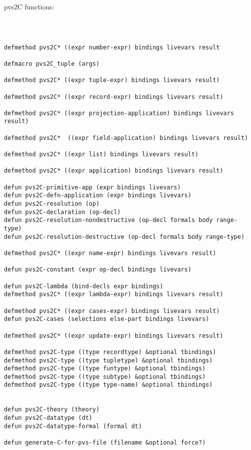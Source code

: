 \documentclass[12pt,a4paper,titlepage]{article}
\begin{document}
pvs2C functions:
\begin{lstlisting}



defmethod pvs2C* ((expr number-expr) bindings livevars result

defmacro pvs2C_tuple (args)

defmethod pvs2C* ((expr tuple-expr) bindings livevars result)

defmethod pvs2C* ((expr record-expr) bindings livevars result)

defmethod pvs2C* ((expr projection-application) bindings livevars result)

defmethod pvs2C*  ((expr field-application) bindings livevars result)

defmethod pvs2C* ((expr list) bindings livevars result)

defmethod pvs2C* ((expr application) bindings livevars result)

defun pvs2C-primitive-app (expr bindings livevars)
defun pvs2C-defn-application (expr bindings livevars)
defun pvs2C-resolution (op)
defun pvs2C-declaration (op-decl)
defun pvs2C-resolution-nondestructive (op-decl formals body range-type)
defun pvs2C-resolution-destructive (op-decl formals body range-type)

defmethod pvs2C* ((expr name-expr) bindings livevars result)

defun pvs2C-constant (expr op-decl bindings livevars)

defun pvs2C-lambda (bind-decls expr bindings) 
defmethod pvs2C* ((expr lambda-expr) bindings livevars result)

defmethod pvs2C* ((expr cases-expr) bindings livevars result)
defun pvs2C-cases (selections else-part bindings livevars)

defmethod pvs2C* ((expr update-expr) bindings livevars result)

defmethod pvs2C-type ((type recordtype) &optional tbindings)
defmethod pvs2C-type ((type tupletype) &optional tbindings)
defmethod pvs2C-type ((type funtype) &optional tbindings)
defmethod pvs2C-type ((type subtype) &optional tbindings)
defmethod pvs2C-type ((type type-name) &optional tbindings)


defun pvs2C-theory (theory)
defun pvs2C-datatype (dt)
defun pvs2C-datatype-formal (formal dt)

defun generate-C-for-pvs-file (filename &optional force?)
\end{lstlisting}
\end{document}
